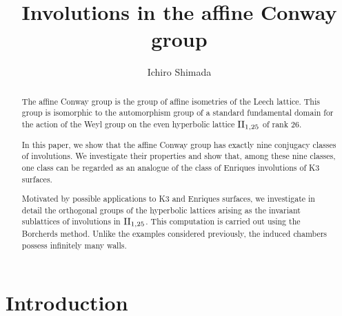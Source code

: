 \documentclass{amsart} %
\begin{document}
%
\title[Involutions in the affine Conway group]
{Involutions in the affine Conway group}
%
\author{Ichiro Shimada}
\address{Department of Mathematics,
Graduate School of Science,
Hiroshima University,
1-3-1 Kagamiyama,
Higashi-Hiroshima,
739-8526 JAPAN}
%
%
%
\begin{abstract}
The affine Conway group is the group of affine isometries of the Leech lattice.
This group is isomorphic to the automorphism group of 
a standard fundamental domain for the action of 
the Weyl group on the even                                                                                                                                                                                                                                                                                                      hyperbolic lattice $\mathrm{II}_{1, 25}$ of rank $26$.
 \par
In this paper, we show that the affine Conway group has exactly nine conjugacy classes of involutions.
We investigate their properties
and show that, 
among these nine classes, 
one class can be regarded as an analogue of the class of Enriques involutions of K3 surfaces.
 \par
Motivated by possible applications to K3 and Enriques surfaces, 
we investigate in detail the orthogonal groups of the hyperbolic lattices 
arising as the invariant sublattices of involutions in $\mathrm{II}_{1, 25}$.
This computation is carried out using the Borcherds method.
Unlike the examples considered previously, 
 the induced chambers possess infinitely many walls.
\end{abstract}
%
\maketitle
%
%
% 
\section{Introduction}
%
\end{document}
